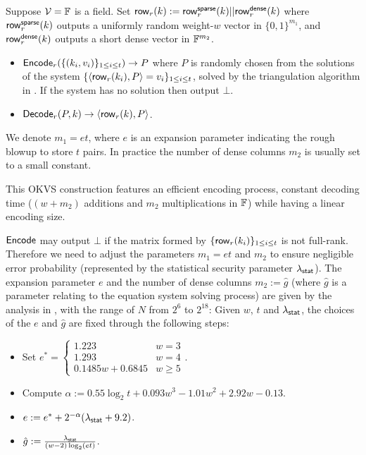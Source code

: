 \begin{construction}\label{con:OKVS_sparse_matrix}
  Suppose $\mathcal{V}=\mathbb{F}$ is a field. Set ${\sf row}_r(k):={\sf row}_r^{\sf sparse}(k)||{\sf row}_r^{\sf dense}(k)$ where ${\sf row}_r^{\sf sparse}(k)$ outputs a uniformly random weight-$w$ vector in $\{0,1\}^{m_1}$, and ${\sf row}_r^{\sf dense}(k)$ outputs a short dense vector in $\mathbb{F}^{m_2}$. 
  \begin{itemize}
    \item ${\sf Encode}_r(\{(k_i,v_i)\}_{1\le i\le t}) \rightarrow P$ where $P$ is randomly chosen from the solutions of the system $\{\langle {\sf row}_r(k_i), P \rangle = v_i\}_{1\le i\le t}$, solved by the triangulation algorithm in \cite{cryptoeprint:2022/320}. If the system has no solution then output $\bot$. 
    \item ${\sf Decode}_r(P,k)\rightarrow \langle {\sf row}_r(k), P \rangle$. 
  \end{itemize}
  We denote $m_1=et$, where $e$ is an expansion parameter indicating the rough blowup to store $t$ pairs. In practice the number of dense columns $m_2$ is usually set to a small constant. 
\end{construction}
This OKVS construction features an efficient encoding process, constant decoding time ($(w+m_2)$ additions and $m_2$ multiplications in $\mathbb{F}$) while having a linear encoding size. 

${\sf Encode}$ may output $\bot$ if the matrix formed by $\{{\sf row}_r(k_i)\}_{1\le i\le t}$ is not full-rank. Therefore we need to adjust the parameters $m_1=et$ and $m_2$ to ensure negligible error probability (represented by the statistical security parameter $\lambda_{\sf stat}$). The expansion parameter $e$ and the number of dense columns $m_2:=\hat{g}$ (where $\hat{g}$ is a parameter relating to the equation system solving process) are given by the analysis in \cite{cryptoeprint:2022/320}, with the range of $N$ from $2^6$ to $2^{18}$: Given $w$, $t$ and $\lambda_{\sf stat}$, the choices of the $e$ and $\hat{g}$ are fixed through the following steps: 
\begin{itemize}
  \item Set $e^* = \begin{cases}
    1.223 & w=3\\
    1.293 & w=4\\
    0.1485w+0.6845 & w\ge 5
  \end{cases}$.
  \item Compute $\alpha:=0.55 \log_2 t + 0.093w^3-1.01w^2 + 2.92w-0.13$.
  \item $e:=e^*+ 2^{-\alpha}(\lambda_{\sf stat}+9.2)$. 
  \item $\hat{g}:=\frac{\lambda_{\sf stat}}{(w-2)\log_2(et)}$. 
\end{itemize}


